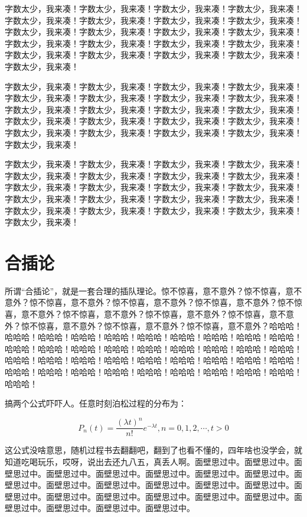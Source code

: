 \documentclass[a4paper,12pt]{book} %
\begin{document}
字数太少，我来凑！字数太少，我来凑！字数太少，我来凑！字数太少，我来凑！字数太少，我来凑！字数太少，我来凑！字数太少，我来凑！字数太少，我来凑！字数太少，我来凑！字数太少，我来凑！字数太少，我来凑！字数太少，我来凑！字数太少，我来凑！字数太少，我来凑！字数太少，我来凑！字数太少，我来凑！字数太少，我来凑！字数太少，我来凑！字数太少，我来凑！字数太少，我来凑！字数太少，我来凑！

字数太少，我来凑！字数太少，我来凑！字数太少，我来凑！字数太少，我来凑！字数太少，我来凑！字数太少，我来凑！字数太少，我来凑！字数太少，我来凑！字数太少，我来凑！字数太少，我来凑！字数太少，我来凑！字数太少，我来凑！字数太少，我来凑！字数太少，我来凑！字数太少，我来凑！字数太少，我来凑！字数太少，我来凑！字数太少，我来凑！字数太少，我来凑！字数太少，我来凑！字数太少，我来凑！

字数太少，我来凑！字数太少，我来凑！字数太少，我来凑！字数太少，我来凑！字数太少，我来凑！字数太少，我来凑！字数太少，我来凑！字数太少，我来凑！字数太少，我来凑！字数太少，我来凑！字数太少，我来凑！字数太少，我来凑！字数太少，我来凑！字数太少，我来凑！字数太少，我来凑！字数太少，我来凑！字数太少，我来凑！字数太少，我来凑！字数太少，我来凑！字数太少，我来凑！字数太少，我来凑！

\section{合插论}

所谓“合插论”，就是一套合理的插队理论。惊不惊喜，意不意外？惊不惊喜，意不意外？惊不惊喜，意不意外？惊不惊喜，意不意外？惊不惊喜，意不意外？惊不惊喜，意不意外？惊不惊喜，意不意外？惊不惊喜，意不意外？惊不惊喜，意不意外？惊不惊喜，意不意外？惊不惊喜，意不意外？惊不惊喜，意不意外？哈哈哈！哈哈哈！哈哈哈！哈哈哈！哈哈哈！哈哈哈！哈哈哈！哈哈哈！哈哈哈！哈哈哈！哈哈哈！哈哈哈！哈哈哈！哈哈哈！哈哈哈！哈哈哈！哈哈哈！哈哈哈！哈哈哈！哈哈哈！哈哈哈！哈哈哈！哈哈哈！哈哈哈！哈哈哈！哈哈哈！哈哈哈！哈哈哈！哈哈哈！哈哈哈！哈哈哈！哈哈哈！哈哈哈！哈哈哈！哈哈哈！哈哈哈！哈哈哈！哈哈哈！

搞两个公式吓吓人。任意时刻泊松过程的分布为：

$$P_n(t) = \frac{(\lambda t)^n}{n !} e^{-\lambda t}, n = 0, 1, 2, \cdots, t > 0$$

这公式没啥意思，随机过程书去翻翻吧，翻到了也看不懂的，四年啥也没学会，就知道吃喝玩乐，哎呀，说出去还九八五，真丢人啊。面壁思过中。面壁思过中。面壁思过中。面壁思过中。面壁思过中。面壁思过中。面壁思过中。面壁思过中。面壁思过中。面壁思过中。面壁思过中。面壁思过中。面壁思过中。面壁思过中。面壁思过中。面壁思过中。面壁思过中。面壁思过中。面壁思过中。面壁思过中。面壁思过中。面壁思过中。面壁思过中。面壁思过中。
\end{document}
